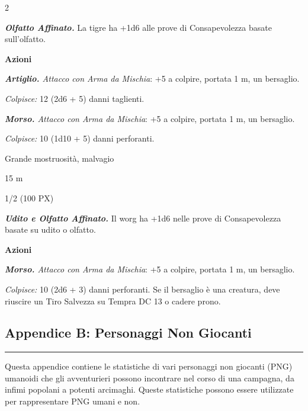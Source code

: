\begin{multicols}{2}
{\emph{\textbf{Olfatto Affinato.}} La tigre ha +1d6 alle prove di Consapevolezza basate sull'olfatto.

\textbf{Azioni}

\emph{\textbf{Artiglio.} Attacco con Arma da Mischia}: +5 a colpire, portata 1 m, un bersaglio.

\emph{Colpisce:} 12 (2d6 + 5) danni taglienti.

\emph{\textbf{Morso.} Attacco con Arma da Mischia}: +5 a colpire, portata 1 m, un bersaglio.

\emph{Colpisce:} 10 (1d10 + 5) danni perforanti.

\begin{description}[noitemsep, topsep=0pt, parsep=0pt, partopsep=0pt, itemsep=1pt, leftmargin=2.35cm,  labelwidth=2.2cm, itemindent=0cm, listparindent=0pt] %
\setlength{\baselineskip}{10pt}
\item[\textbf{Taglia/Tipo}] Grande mostruosità, malvagio
\item[\textbf{Caratt.}] 
\item[\textbf{Punti Ferita}] 
\item[\textbf{Tiri Salvez.}] 
\item[\textbf{Movimento}] 15 m
\item[\textbf{Sfida}] 1/2 (100 PX)
\end{description}
\smallskip

\emph{\textbf{Udito e Olfatto Affinato.}} Il worg ha +1d6 nelle prove di Consapevolezza basate su udito o olfatto.

\textbf{Azioni}

\emph{\textbf{Morso.} Attacco con Arma da Mischia}: +5 a colpire, portata 1 m, un bersaglio.

\emph{Colpisce:} 10 (2d6 + 3) danni perforanti. Se il bersaglio è una creatura, deve riuscire un Tiro Salvezza su Tempra DC 13 o cadere prono.

\subsection{Appendice B: Personaggi Non Giocanti}\noindent\rule{\linewidth}{2pt} 

Questa appendice contiene le statistiche di vari personaggi non giocanti (PNG) umanoidi che gli avventurieri possono incontrare nel corso di una campagna, da infimi popolani a potenti arcimaghi. Queste statistiche possono essere utilizzate per rappresentare PNG umani e non.

}
\end{multicols}
